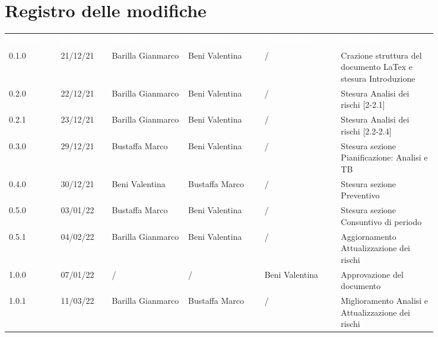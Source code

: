 \section*{Registro delle modifiche}

{\renewcommand{\arraystretch}{1.5}
\scriptsize
\begin{tabular}{p{0.10\linewidth}p{0.10\linewidth}p{0.15\linewidth}p{0.15\linewidth}p{0.15\linewidth}p{0.19\linewidth}}
	\rowcolor[RGB]{33, 73, 50}
	\textcolor{white}{\textbf{Versione}} & \textcolor{white}{\textbf{Data}} &
	\textcolor{white}{\textbf{Redattore}} & \textcolor{white}{\textbf{Verificatore}} &
	\textcolor{white}{\textbf{Approvatore}} & \textcolor{white}{\textbf{Descrizione}}\\
	\rowcolor[RGB]{216, 235, 171}
	0.1.0 & 21/12/21 & Barilla Gianmarco & Beni Valentina & / & Crazione struttura del documento LaTex e stesura Introduzione\\
	\rowcolor[RGB]{233, 245, 206}
	0.2.0 & 22/12/21 & Barilla Gianmarco & Beni Valentina & / & Stesura Analisi dei rischi [2-2.1]\\
	\rowcolor[RGB]{216, 235, 171}
	0.2.1 & 23/12/21 & Barilla Gianmarco& Beni Valentina & / & Stesura Analisi dei rischi [2.2-2.4]\\
	\rowcolor[RGB]{233, 245, 206}
	0.3.0 & 29/12/21 & Bustaffa Marco& Beni Valentina & / & Stesura sezione Pianificazione: Analisi e TB\\
	\rowcolor[RGB]{216, 235, 171}
	0.4.0 & 30/12/21 & Beni Valentina& Bustaffa Marco & / & Stesura sezione Preventivo\\
	\rowcolor[RGB]{233, 245, 206}
	0.5.0 & 03/01/22 & Bustaffa Marco& Beni Valentina & / & Stesura sezione Consuntivo di periodo\\
	\rowcolor[RGB]{216, 235, 171}
	0.5.1 & 04/02/22 & Barilla Gianmarco& Beni Valentina & / & Aggiornamento Attualizzazione dei rischi\\
	\rowcolor[RGB]{233, 245, 206}
	1.0.0 & 07/01/22 & / & / & Beni Valentina & Approvazione del documento\\
	\rowcolor[RGB]{216, 235, 171}
	1.0.1 & 11/03/22 & Barilla Gianmarco& Bustaffa Marco & / & Miglioramento Analisi e Attualizzazione dei rischi\\
\end{tabular}	
}